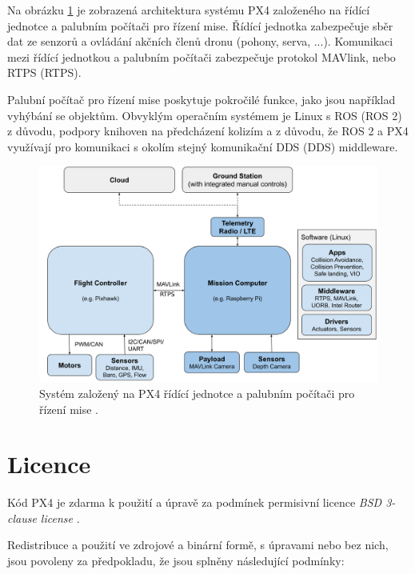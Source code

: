 Na obrázku \ref{fig:PX4_FC_PC} je zobrazená architektura systému PX4 založeného na řídící jednotce a palubním počítači pro řízení mise. Řídící jednotka zabezpečuje sběr dat ze senzorů a ovládání akčních členů dronu (pohony, serva, ...). Komunikaci mezi řídící jednotkou a palubním počítači zabezpečuje protokol MAVlink, nebo \acs{RTPS} (\acl{RTPS}).

Palubní počítač pro řízení mise poskytuje pokročilé funkce, jako jsou například vyhýbání se objektům. Obvyklým operačním systémem je Linux s ROS (ROS 2) z důvodu, podpory knihoven na předcházení kolizím a z důvodu, že ROS 2 a PX4 využívají pro komunikaci s okolím stejný komunikační \acs{DDS} (\acl{DDS}) middleware.

\begin{figure}[!ht]
    \begin{center}
        \includegraphics[scale=0.37]{obrazky/PX43}
    \end{center}
    \caption[Systém založený na PX4 řídící jednotce a palubním počítači pro řízení mise]{Systém založený na PX4 řídící jednotce a palubním počítači pro řízení mise \cite{PX4docs}.}
    \label{fig:PX4_FC_PC}
\end{figure}

\section{Licence}

Kód PX4 je zdarma k použití a úpravě za podmínek permisivní licence \textit{BSD 3-clause license} \cite{BSDlicense}.

Redistribuce a použití ve zdrojové a binární formě, s úpravami nebo bez nich, jsou povoleny za předpokladu, že jsou splněny následující podmínky:

